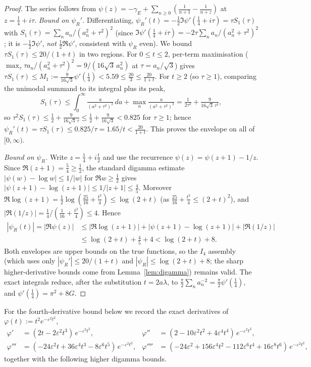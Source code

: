\documentclass[11pt]{article}
\newcommand{\psiR}{\psi_{R}}                %
\begin{document}
\begin{proof}
The series follows from
$\psi(z)=-\gamma_E+\sum_{n\ge 0}(\tfrac{1}{n+1}-\tfrac{1}{n+z})$ at
$z=\tfrac14+i\tau$.
\emph{Bound on $\psiR'$.} Differentiating,
$\psiR'(t)=-\tfrac12\Im\psi'(\tfrac14+i\tau)=\tau S_1(\tau)$ with
$S_1(\tau)=\sum_n a_n/(a_n^2+\tau^2)^2$ (since
$\Im\psi'(\tfrac14+i\tau)=-2\tau\sum_n a_n/(a_n^2+\tau^2)^2$; it is
$-\tfrac12\Im\psi'$, \emph{not} $\tfrac12\Re\psi'$, consistent with $\psiR$
even). We bound $\tau S_1(\tau)\le 20/(1+t)$ in two regions.
For $0\le t\le 2$, per-term maximisation
($\max_\tau\tau a_n/(a_n^2+\tau^2)^2=9/(16\sqrt3\,a_n^2)$ at $\tau=a_n/\sqrt3$)
gives $\tau S_1(\tau)\le M_1:=\tfrac{9}{16\sqrt3}\psi'(\tfrac14)<5.59
\le\tfrac{20}{3}\le\tfrac{20}{1+t}$.
For $t\ge2$ (so $\tau\ge1$), comparing the unimodal summand to its integral
plus its peak,
\[
S_1(\tau)\le\int_0^\infty\!\tfrac{a}{(a^2+\tau^2)^2}\,da
+\max_a\tfrac{a}{(a^2+\tau^2)^2}
=\tfrac{1}{2\tau^2}+\tfrac{9}{16\sqrt3\,\tau^3},
\]
so $\tau^2 S_1(\tau)\le\tfrac12+\tfrac{9}{16\sqrt3\,\tau}
\le\tfrac12+\tfrac{9}{16\sqrt3}<0.825$ for $\tau\ge1$; hence
$\psiR'(t)=\tau S_1(\tau)\le 0.825/\tau=1.65/t<\tfrac{20}{1+t}$. This proves the
envelope on all of $[0,\infty)$.

\emph{Bound on $\psiR$.} Write $z=\tfrac14+i\tfrac t2$ and use the recurrence
$\psi(z)=\psi(z+1)-1/z$. Since $\Re(z+1)=\tfrac54\ge\tfrac12$, the standard
digamma estimate $|\psi(w)-\log w|\le 1/|w|$ for $\Re w\ge\tfrac12$
\cite[6.3.18]{AbramowitzStegun} gives
$|\psi(z+1)-\log(z+1)|\le 1/|z+1|\le\tfrac45$. Moreover
$\Re\log(z+1)=\tfrac12\log(\tfrac{25}{16}+\tfrac{t^2}{4})\le\log(2+t)$ (as
$\tfrac{25}{16}+\tfrac{t^2}{4}\le(2+t)^2$), and
$|\Re(1/z)|=\tfrac14/(\tfrac1{16}+\tfrac{t^2}{4})\le 4$. Hence
\[
\begin{aligned}
|\psiR(t)|=|\Re\psi(z)|
&\le|\Re\log(z+1)|+|\psi(z+1)-\log(z+1)|+|\Re(1/z)|\\
&\le\log(2+t)+\tfrac45+4<\log(2+t)+8.
\end{aligned}
\]
Both envelopes are upper bounds on the true functions, so the $I_4$ assembly
(which uses only $|\psiR'|\le20/(1+t)$ and $|\psiR|\le\log(2+t)+8$; the sharp
higher-derivative bounds come from Lemma~\ref{lem:digamma}) remains valid.
The exact integrals reduce, after the substitution $t=2a\lambda$, to
$\tfrac{\pi}{2}\sum_n a_n^{-2}=\tfrac{\pi}{2}\psi'(\tfrac14)$, and
$\psi'(\tfrac14)=\pi^2+8G$.
\end{proof}

For the fourth-derivative bound below we record the exact derivatives of
$\varphi(t):=t^2 e^{-\varepsilon^2 t^2}$,
\begin{align*}
\varphi'   &= (2t-2\varepsilon^2 t^3)\,e^{-\varepsilon^2 t^2}, &
\varphi''  &= (2-10\varepsilon^2 t^2+4\varepsilon^4 t^4)\,e^{-\varepsilon^2 t^2},\\
\varphi''' &= (-24\varepsilon^2 t+36\varepsilon^4 t^3-8\varepsilon^6 t^5)\,e^{-\varepsilon^2 t^2}, &
\varphi''''&= (-24\varepsilon^2+156\varepsilon^4 t^2-112\varepsilon^6 t^4+16\varepsilon^8 t^6)\,e^{-\varepsilon^2 t^2},
\end{align*}
together with the following higher digamma bounds.
\end{document}
